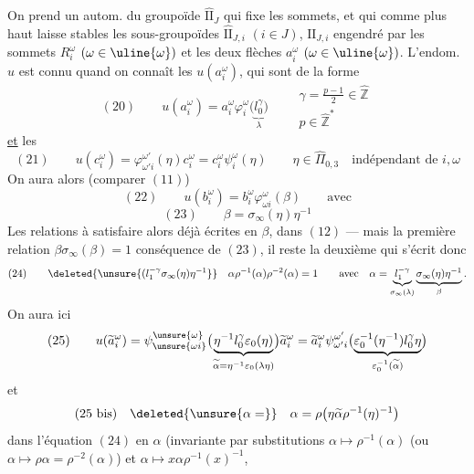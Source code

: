 On prend un autom.  du groupoïde $\widehat{\mathrm{II}}_J$ qui  fixe les sommets, et qui comme plus haut laisse stables les sous-groupoïdes $\widehat{\mathrm{II}}_{J,i}$ $(i\in J)$,  $\mathrm{II}_{J,i}$ engendré par les  sommets $R_i^\omega$ $(\omega\in\uline{\omega})$ et les deux flèches $a_i^\omega$ $(\omega\in\uline{\omega})$.
 L'endom. $u$ est connu quand on connaît les $u(a_i^\omega)$, qui sont de la forme
\[
(20)\qquad u(a_i^\omega)=a_i^\omega\varphi_i^\omega\bigl(\underbrace{l_0^\gamma}_{\lambda}\bigr)
\qquad\begin{array}{l}\gamma=\frac{p-1}{2}\in\widehat{\mathbb Z}\\p\in\widehat{\mathbb Z}^{*}\end{array}
\]
\uline{et} les
\[
(21)\qquad u(c_i^\omega)=\varphi_{\omega'i}^{\omega'}(\eta)c_i^\omega=c_i^\omega\psi_i^\omega(\eta)
\qquad\eta\in\widehat\Pi_{0,3}\quad\text{indépendant de }i,\omega
\]
On aura alors (comparer $(11)$)
\[
(22)\qquad u(b_i^\omega)=b_i^\omega\varphi_{\omega i}^\omega(\beta)\qquad\text{avec}
\]
\[
(23)\qquad\beta=\sigma_\infty(\eta)\eta^{-1}
\]
Les relations à satisfaire  alors déjà écrites en  $\beta$,  dans $(12)$ --- mais la première relation $\beta\sigma_\infty(\beta)=1$ conséquence de $(23)$, il reste la deuxième qui s'écrit donc
\[
(24)\qquad\deleted{\unsure{(l_1^{-\gamma}\sigma_\infty(\eta)\eta^{-1}}}
\quad\alpha\rho^{-1}(\alpha)\rho^{-2}(\alpha)=1
\qquad\text{avec}\quad\alpha=\underbrace{l_1^{-\gamma}}_{\sigma_\infty(\lambda)}\underbrace{\sigma_\infty(\eta)\eta^{-1}}_\beta.
\]
On aura ici
\[
(25)\qquad
u(\widetilde a_i^\omega)=\psi_{\unsure{\omega i}}^{\unsure{\omega}}\bigl(\underbrace{\eta^{-1}l_0^\gamma\varepsilon_0(\eta)}_{\widetilde\alpha=\eta^{-1}\varepsilon_0(\lambda\eta)}\bigr)\widetilde a_i^\omega
=\widetilde a_i^\omega\psi_{\omega'i}^{\omega'}\bigl(\underbrace{\varepsilon_0^{-1}(\eta^{-1})l_0^\gamma\eta}_{\varepsilon_0^{-1}(\widetilde\alpha)}\bigr)
\]
et
\[
(25\text{ bis})\quad\deleted{\unsure{\alpha=}}\quad\alpha=\rho\bigl(\eta\widetilde\alpha\rho^{-1}(\eta)^{-1}\bigr)
\]
 dans l'équation $(24)$ en $\alpha$ (invariante par substitutions $\alpha\mapsto\rho^{-1}(\alpha)$ (ou $\alpha\mapsto\rho\alpha=\rho^{-2}(\alpha)$) et $\alpha\mapsto x\alpha\rho^{-1}(x)^{-1}$,
